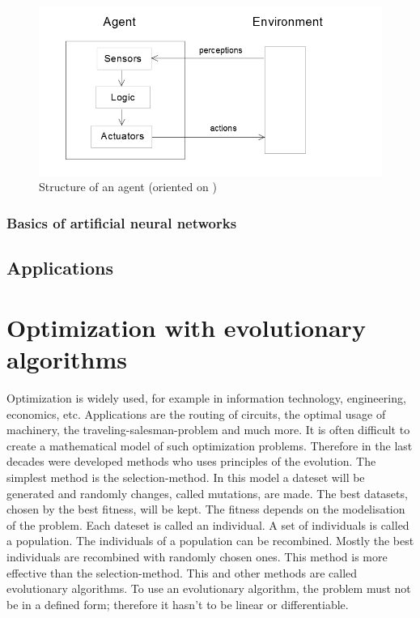 \documentclass[10pt,a4paper,DIV=11]{scrreprt}
\begin{document}
\begin{center}
	\begin{figure}[H]
		\centering
		\includegraphics[width=1.0\textwidth,scale=1]{files/agent.png}  
		\caption{Structure of an agent (oriented on \cite{ki-book} )} 
		\label{fig:agent}
	\end{figure}
\end{center}

\subsection{Basics of artificial neural networks}

\section{Applications}

\chapter{Optimization with evolutionary algorithms}



Optimization is widely used, for example in information technology, engineering,
economics, etc. Applications are the routing of circuits, the optimal usage of machinery,
the traveling-salesman-problem and much more. It is often difficult to create a mathematical
model of such optimization problems. Therefore in the last decades were developed methods who
uses principles of the evolution.
The simplest method is the selection-method. In this model a dateset will be generated and randomly
changes, called mutations, are made. The best datasets, chosen by the best fitness, will be kept. The fitness depends on the modelisation of the problem.
Each dateset is called an individual. A set of individuals is called a population. The individuals
of a population can be recombined. Mostly the best individuals are recombined with randomly chosen
ones. This method is more effective than the selection-method. This and other methods are  called
evolutionary algorithms. To use an evolutionary algorithm, the problem must not be in a defined form;
therefore it hasn't to be linear or differentiable. \\
\end{document}
